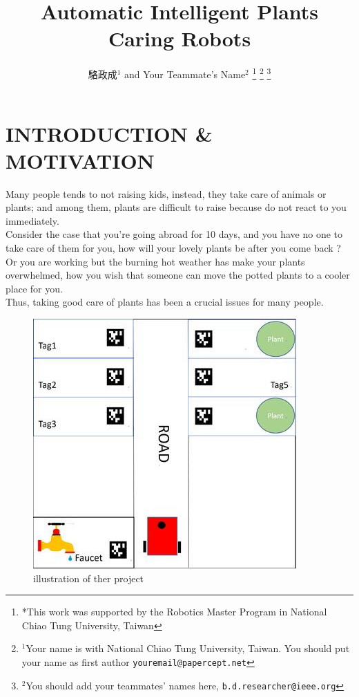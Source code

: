 \documentclass[a4paper, 10pt, conference]{ieeeconf}      %
\title{\LARGE \bf
Automatic Intelligent Plants Caring Robots
}
\author{駱政成$^{1}$ and Your Teammate's Name$^{2}$%
\thanks{*This work was supported by the Robotics Master Program in National Chiao Tung University, Taiwan}%
\thanks{$^{1}$Your name is with National Chiao Tung University, Taiwan. You should put your name as first author
        {\tt\small youremail@papercept.net}}%
\thanks{$^{2}$You should add your teammates' names here,
        {\tt\small b.d.researcher@ieee.org}}%
}
\begin{document}
\maketitle
\thispagestyle{empty}
\pagestyle{empty}


\section{INTRODUCTION \& MOTIVATION}

\hspace*{4mm} Many people tends to not raising kids, instead, they take care of animals or plants; and among them, plants are difficult to raise because do not react to you immediately.\\
\hspace*{4mm}Consider the case that you're going abroad for 10 days, and you have no one to take care of them for you, how will your lovely plants be after you come back ?  Or you are working but the burning hot weather has make your plants overwhelmed, how you wish that someone can move the potted plants to a cooler place for you.\\
\hspace*{4mm}Thus, taking good care of plants has been a crucial issues for many people.\\

\begin{figure}[htbp] %
\includegraphics[width=0.8\columnwidth]{23602259_1745798205444844_1157434552_n.jpg}
\centering
\caption{illustration of ther project}
\end{figure}
\end{document}
